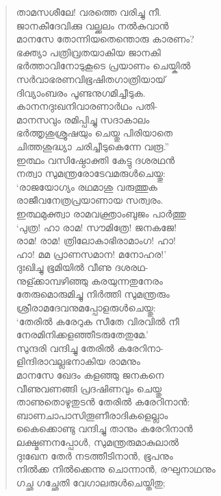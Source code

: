 \begin{verse}
താമസശീലേ! വരത്തെ വരിച്ചു നീ.\\
ജാനകീദേവിക്കു വല്ക്കലം നല്‍കുവാന്‍\\
മാനസേ തോന്നിയതെന്തൊരു കാരണം?\\
ഭക്ത്യാ പത്രിവ്രതയാകിയ ജാനകി\\
ഭര്‍ത്താവിനോടുകൂടെ പ്രയാണം ചെയ്കില്‍\\
സര്‍വാഭരണവിഭൂഷിതഗാത്രിയായ്\\
ദിവ്യാംബരം പൂണ്ടനുഗമിച്ചീടുക.\\
കാനനദുഃഖനിവാരണാര്‍ഥം പതി-\\
മാനസവും രമിപ്പിച്ചു സദാകാലം\\
ഭര്‍ത്തൃശുശ്രൂഷയും ചെയ്തു പിരിയാതെ\\
ചിത്തശുദ്ധ്യാ ചരിച്ചീടുകെന്നേ വരൂ.”\\
ഇത്ഥം വസിഷ്ഠോക്തി കേട്ടു ദശരഥന്‍\\
നത്വാ സുമന്ത്രരോടേവമരുള്‍ചെയ്തു:\\
‘രാജയോഗ്യം രഥമാശു വരുത്തുക\\
രാജീവനേത്രപ്രയാണായ സത്വരം.\\
ഇത്ഥമുക്ത്വാ രാമവക്ത്രാംബുജം പാര്‍ത്തു\\
‘പുത്ര! ഹാ രാമ! സൗമിത്രേ! ജനകജേ!\\
രാമ! രാമ! ത്രിലോകാഭിരാമാംഗ! ഹാ!\\
ഹാ! മമ പ്രാണസമാന! മനോഹര!’\\
ദുഃഖിച്ചു ഭൂമിയില്‍ വീണു ദശരഥ-\\
നുള്ക്കാമ്പഴിഞ്ഞു കരയുന്നതുനേരം\\
തേരുമൊരുമിച്ചു നിര്‍ത്തി സുമന്ത്രരും\\
ശ്രീരാമദേവനുമപ്പോളരുള്‍ചെയ്തു:\\
‘തേരില്‍ കരേറുക സീതേ വിരവില്‍ നീ\\
നേരമിനിക്കളഞ്ഞീടരുതേതുമേ.’\\
സുന്ദരി വന്ദിച്ചു തേരില്‍ കരേറിനാ-\\
ളിന്ദിരാവല്ലഭനാകിയ രാമനും\\
മാനസേ ഖേദം കളഞ്ഞു ജനകനെ\\
വീണുവണങ്ങി പ്രദഷിണവും ചെയ്തു\\
താണുതൊഴുതുടന്‍ തേരില്‍ കരേറിനാന്‍:\\
ബാണചാപാസിതൂണീരാദികളെല്ലാം\\
കൈക്കൊണ്ടു വന്ദിച്ചു താനും കരേറിനാന്‍\\
ലക്ഷ്മണനപ്പോള്‍, സുമന്ത്രരുമാകുലാല്‍\\
ദുഃഖേന തേര്‍ നടത്തീടിനാന്‍, ഭൂപനും\\
നില്‍ക്ക നില്‍ക്കെന്നു ചൊന്നാന്‍, രഘുനാഥനും\\
ഗച്ഛ ഗച്ഛേതി വേഗാലരുള്‍ചെയ്തിതു;\\

\end{verse}

